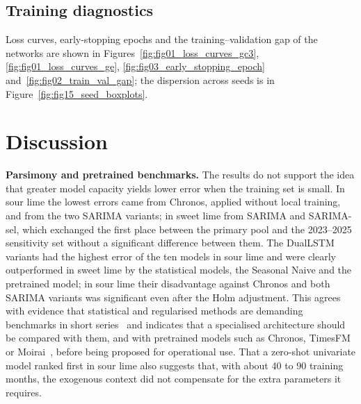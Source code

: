 \documentclass[forecasting,article,submit,moreauthors]{Definitions/mdpi}
\begin{document}
\subsection{Training diagnostics}
Loss curves, early-stopping epochs and the training--validation gap of the networks are shown in Figures~\ref{fig:fig01_loss_curves_gc3}, \ref{fig:fig01_loss_curves_ge}, \ref{fig:fig03_early_stopping_epoch} and~\ref{fig:fig02_train_val_gap}; the dispersion across seeds is in Figure~\ref{fig:fig15_seed_boxplots}. 




\section{Discussion}

\textbf{Parsimony and pretrained benchmarks.} The results do not support the idea that greater model capacity yields lower error when the training set is small. In sour lime the lowest errors came from Chronos, applied without local training, and from the two SARIMA variants; in sweet lime from SARIMA and SARIMA-sel, which exchanged the first place between the primary pool and the 2023--2025 sensitivity set without a significant difference between them. The DualLSTM variants had the highest error of the ten models in sour lime and were clearly outperformed in sweet lime by the statistical models, the Seasonal Naive and the pretrained model; in sour lime their disadvantage against Chronos and both SARIMA variants was significant even after the Holm adjustment. This agrees with evidence that statistical and regularised methods are demanding benchmarks in short series~\cite{makridakis2020m4,hewamalage2021rnn,rather2024breaking} and indicates that a specialised architecture should be compared with them, and with pretrained models such as Chronos, TimesFM or Moirai~\cite{ansari2024chronos,das2024decoder,woo2024unified}, before being proposed for operational use. That a zero-shot univariate model ranked first in sour lime also suggests that, with about 40 to 90 training months, the exogenous context did not compensate for the extra parameters it requires.
\end{document}

